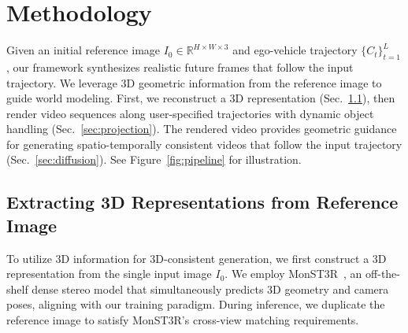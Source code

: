 \documentclass{article}
\begin{document}
\section{Methodology}
\label{sec:methodology}


Given an initial reference image \( I_{0} \in \mathbb{R}^{H \times W \times 3} \) and ego-vehicle trajectory \( \{C_t\}_{t=1}^L \), our framework synthesizes realistic future frames that follow the input trajectory. We leverage 3D geometric information from the reference image to guide world modeling. First, we reconstruct a 3D representation (Sec.~\ref{sec:3d_reconstruction}), then render video sequences along user-specified trajectories with dynamic object handling (Sec.~\ref{sec:projection}). The rendered video provides geometric guidance for generating spatio-temporally consistent videos that follow the input trajectory (Sec.~\ref{sec:diffusion}). See Figure~\ref{fig:pipeline} for illustration.

\subsection{Extracting 3D Representations from Reference Image}
\label{sec:3d_reconstruction}
To utilize 3D information for 3D-consistent generation, we first construct a 3D representation from the single input image \( I_0 \). We employ MonST3R~\cite{zhang2024monst3r}, an off-the-shelf dense stereo model that simultaneously predicts 3D geometry and camera poses, aligning with our training paradigm. During inference, we duplicate the reference image to satisfy MonST3R's cross-view matching requirements.
\end{document}
